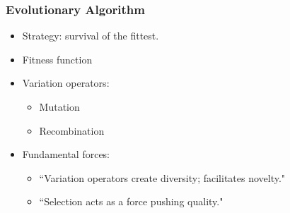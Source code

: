 %
\frame
{
	\frametitle{Evolutionary Algorithm}

	\begin{itemize}
		\item Strategy: survival of the fittest.
		\item Fitness function
		\item Variation operators:
			\begin{itemize}
				\item Mutation
				\item Recombination
			\end{itemize}
		\item Fundamental forces:
			\begin{itemize}
					\item ``Variation operators create diversity; facilitates novelty."
					\item ``Selection acts as a force pushing quality."
			\end{itemize}
	\end{itemize}
}

